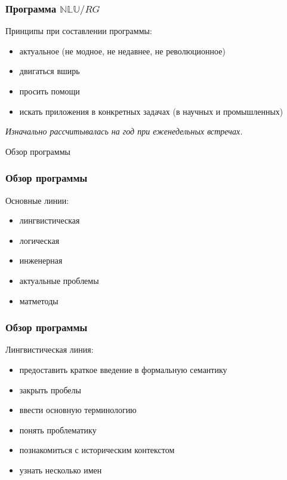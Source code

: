 \documentclass{beamer}
\begin{document}
\begin{frame}[fragile]
\frametitle{Программа $\mathbb{NLU}/RG$}
Принципы при составлении программы:\bigskip 
\begin{itemize}
  \item актуальное (не модное, не недавнее, не революционное)
  \item двигаться вширь
  \item просить помощи
  \item искать приложения в конкретных задачах (в научных и промышленных)
\end{itemize}
\bigskip  
\textit{Изначально рассчитывалась на год при еженедельных встречах.}
\end{frame}

\begin{frame}{}
\thispagestyle{empty}
\begin{center}
{\large Обзор программы}
\end{center}
\end{frame}

\begin{frame}[fragile]
\frametitle{Обзор программы}
Основные линии:\bigskip
\begin{itemize}
  \item лингвистическая
  \item логическая
  \item инженерная
  \item актуальные проблемы
  \item матметоды
\end{itemize}
\end{frame}

\begin{frame}[fragile]
\frametitle{Обзор программы}
Лингвистическая линия:\bigskip
\begin{itemize}
  \item предоставить краткое введение в формальную семантику
  \item закрыть пробелы
  \item ввести основную терминологию
  \item понять проблематику
  \item познакомиться с историческим контекстом
  \item узнать несколько имен
\end{itemize}
\end{frame}
\end{document}
